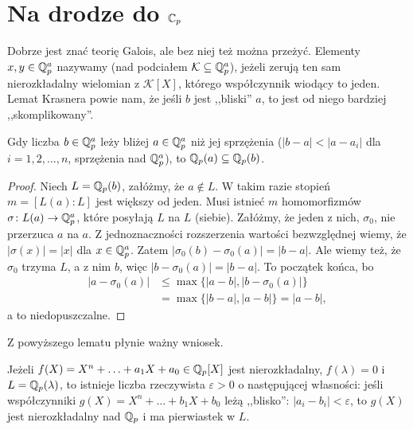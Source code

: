 \section{Na drodze do $\mathbb C_p$}
Dobrze jest znać teorię Galois, ale bez niej też można przeżyć.
Elementy $x, y \in \mathbb Q_p^a$ nazywamy  (nad podciałem $\mathcal K \subseteq \mathbb Q_p^a$), jeżeli zerują ten sam nierozkładalny wielomian z $\mathcal K[X]$, którego współczynnik wiodący to jeden.
Lemat Krasnera powie nam, że jeśli $b$ jest ,,bliski'' $a$, to jest od niego bardziej ,,skomplikowany''.

\begin{twierdzenie}
	Gdy liczba $b \in \mathbb Q_p^a$ leży bliżej $a  \in \mathbb Q_p^a$ niż jej sprzężenia ($|b-a| < |a - a_i|$ dla $i = 1, 2, \dots, n$, sprzężenia nad $\mathbb Q_p^a$), to $\mathbb Q_p(a) \subseteq \mathbb Q_p(b)$.
\end{twierdzenie}

\begin{proof}
	Niech $L = \mathbb Q_p(b)$, załóżmy, że $a \not \in L$.
	W takim razie stopień $m = [L(a) : L]$ jest większy od jeden.
	Musi istnieć $m$ homomorfizmów $\sigma \colon L(a) \to \mathbb Q_p^a$, które posyłają $L$ na $L$ (siebie).
	Załóżmy, że jeden z nich, $\sigma_0$, nie przerzuca $a$ na $a$.
	Z jednoznaczności rozszerzenia wartości bezwzględnej wiemy, że $|\sigma(x)| = |x|$ dla $x \in \mathbb Q_p^a$.
	Zatem $|\sigma_0(b) - \sigma_0(a) | = |b-a|$. Ale wiemy też, że $\sigma_0$ trzyma $L$, a z nim $b$, więc $|b - \sigma_0(a)| = |b-a|$.
	To początek końca, bo
	\begin{align*}
		|a - \sigma_0(a)| & \le \max \{|a-b|, |b-\sigma_0(a)|\}\\
		& = \max \{|b-a|, |a-b|\}= |a-b|,
	\end{align*}
	a to niedopuszczalne.
\end{proof}

Z powyższego lematu płynie ważny wniosek.

\begin{fakt}\label{satis}
	Jeżeli $f(X) = X^n + \ldots + a_1 X + a_0 \in \mathbb Q_p[X]$ jest nierozkładalny, $f(\lambda) = 0$ i $L = \mathbb Q_p(\lambda)$, to istnieje liczba rzeczywista $\varepsilon > 0$ o następującej własności: jeśli współczynniki $g(X) = X^n + \ldots + b_1X + b_0$ leżą ,,blisko'': $|a_i - b_i| < \varepsilon$, to $g(X)$ jest nierozkładalny nad $\mathbb Q_p$ i ma pierwiastek w $L$.
\end{fakt}

